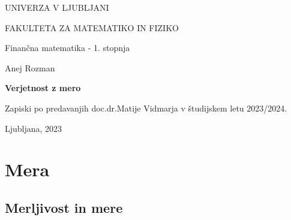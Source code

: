 \documentclass[a4paper,12pt]{article}
\begin{document}
\begin{titlepage}
    UNIVERZA V LJUBLJANI
  
    FAKULTETA ZA MATEMATIKO IN FIZIKO
  
    \vspace{0.5cm}
    Finančna matematika - 1. stopnja
  
    \begin{center}
        \vspace{7cm}
            Anej Rozman
  
        \vspace{0.4cm}
        \textbf{\Large{Verjetnost z mero}}
        \vspace{0.3cm}
  
        Zapiski po predavanjih doc.\@ dr.\@ Matije Vidmarja v študijskem letu 2023/2024.
    \end{center}
    \vfill
        Ljubljana, 2023     
    \thispagestyle{empty}
\end{titlepage}

\newpage
  
\tableofcontents
   
\newpage
    
\section{Mera}
    \subsection{Merljivost in mere}
\end{document}
